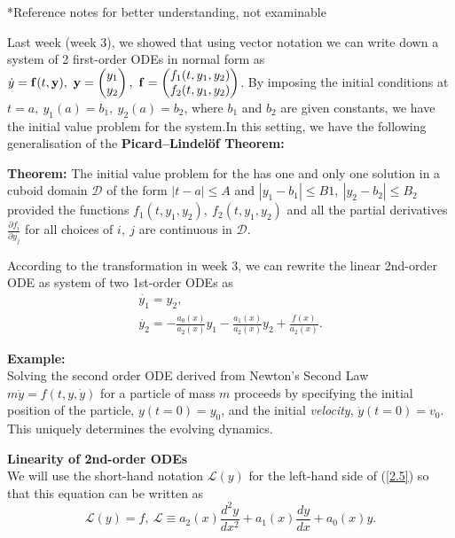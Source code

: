 \documentclass[11pt,a4paper]{article}
\begin{document}
	\begin{tcolorbox}[colback=white, arc=0pt]
		*Reference notes for better understanding, not examinable\par
		Last week (week 3), we showed that using vector notation we can write down a system of 2 first-order ODEs in normal form as
		$
		\dot{y} = \vb{f}(t,\vb{y}),\ 
		\vb{y}
		=
		\begin{pmatrix}
			y_1 \\
			y_2
		\end{pmatrix},\ 
		\vb{f}
		=
		\begin{pmatrix}
			f_1(t, y_1, y_2)\\
			f_2(t, y_1, y_2)
		\end{pmatrix}
		$.
		By imposing the initial conditions at $t = a,\ y_1(a) = b_1,\ y_2(a) = b_2$, where $b_1$ and $b_2$ are given constants, we have the initial value problem for the system.In this setting, we have the following generalisation of the \textbf{Picard–Lindel\"{o}f Theorem:}\par
		\textbf{Theorem:} The initial value problem for the has one and only one solution in a
		cuboid domain $\mathcal{D}$ of the form $|t − a| \leq A$ and $|y_1 − b_1| \leq B1,\ |y_2 − b_2| \leq B_2$ provided the functions $f_1(t, y_1, y_2),\ f_2(t, y_1, y_2)$ and all the partial derivatives $\frac{\partial f_i}{\partial y_j}$ for all choices of
		$i,\ j$ are continuous in $\mathcal{D}$.\par
		According to the transformation in week 3, we can rewrite the linear 2nd-order ODE as  system of two 1st-order ODEs as
		\begin{gather*} 
			\dot{y_1} = y_2, \\ 
			\dot{y_2} = - \frac{a_0(x)}{a_2(x)}y_1-\frac{a_1(x)}{a_2(x)}y_2+\frac{f(x)}{a_2(x)}.
		\end{gather*}
	\end{tcolorbox}
	\textbf{Example:}\\
	Solving the second order ODE derived from Newton’s Second Law $m\ddot{y} = f(t,y,\dot{y})$ for a particle of mass $m$ proceeds by specifying the initial position of the particle, $y(t = 0) = y_0$, and the initial \textit{velocity}, $\dot{y}(t = 0) = v_0$. This uniquely determines the evolving dynamics.\par
	\textbf{Linearity of 2nd-order ODEs}\\
	We will use the short-hand notation $\mathcal{L}(y)$ for the left-hand side of (\ref{2.5}) so that this equation can be written as
	\begin{equation}\label{2.7}
		\mathcal{L}(y) = f,\ \mathcal{L}\equiv a_2(x)\frac{d^2y}{dx^2}+a_1(x)\frac{dy}{dx}+a_0(x)y.
	\end{equation}
\end{document}
